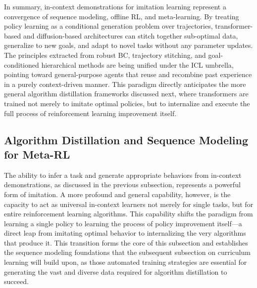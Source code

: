 \documentclass[11pt]{article}
\begin{document}
In summary, in-context demonstrations for imitation learning represent a convergence of sequence modeling, offline RL, and meta-learning. By treating policy learning as a conditional generation problem over trajectories, transformer-based and diffusion-based architectures can stitch together sub-optimal data, generalize to new goals, and adapt to novel tasks without any parameter updates. The principles extracted from robust BC, trajectory stitching, and goal-conditioned hierarchical methods are being unified under the ICL umbrella, pointing toward general-purpose agents that reuse and recombine past experience in a purely context-driven manner. This paradigm directly anticipates the more general algorithm distillation frameworks discussed next, where transformers are trained not merely to imitate optimal policies, but to internalize and execute the full process of reinforcement learning improvement itself.

\subsection{Algorithm Distillation and Sequence Modeling for Meta-RL}

The ability to infer a task and generate appropriate behaviors from in-context demonstrations, as discussed in the previous subsection, represents a powerful form of imitation. A more profound and general capability, however, is the capacity to act as universal in-context learners not merely for single tasks, but for entire reinforcement learning algorithms. This capability shifts the paradigm from learning a single policy to learning the process of policy improvement itself---a direct leap from imitating optimal behavior to internalizing the very algorithms that produce it. This transition forms the core of this subsection and establishes the sequence modeling foundations that the subsequent subsection on curriculum learning will build upon, as those automated training strategies are essential for generating the vast and diverse data required for algorithm distillation to succeed.
\end{document}
